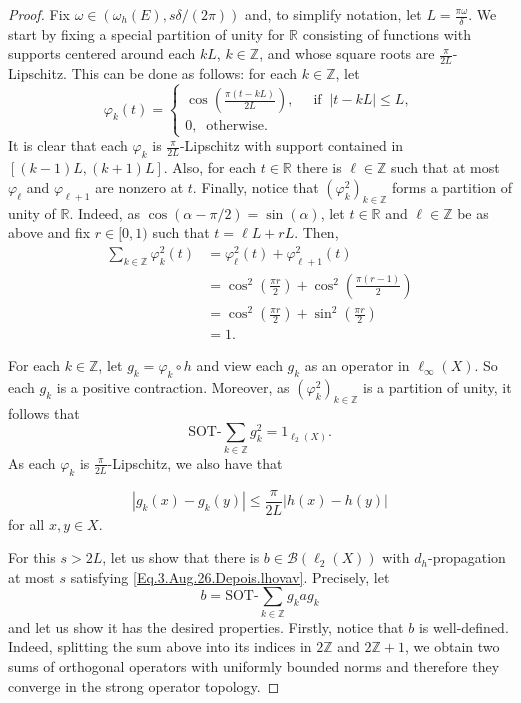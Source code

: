 \documentclass[11pt]{amsart}
\newcommand{\R}{\mathbb{R}}
\newcommand{\Z}{\mathbb{Z}}
\newcommand{\cB}{\mathcal{B}}
\numberwithin{equation}{section}
\theoremstyle{definition}
\theoremstyle{remark}
\begin{document}
\begin{proof}
Fix    $\omega\in(\omega_h(E),s\delta/(2\pi))$ and, to simplify notation, let   $L=\tfrac{\pi\omega}{\delta}$. We start by fixing   a special partition of unity for $\R$ consisting of functions with supports centered around each $kL$, $k\in\Z$, and whose square roots are $\tfrac{\pi}{2L}$-Lipschitz. This can be done as follows: for each $k\in \Z$, let
\begin{equation}\varphi_k(t)=\left\{\begin{array}{ll}
\cos\left(\frac{\pi(t-kL)}{2L}\right) ,    & \ \text{ if }\ |t-kL|\leq L,\\
    0, \ \text{ otherwise}.&
\end{array}\right.
\end{equation}
It is clear that each $\varphi_k$ is $\tfrac{\pi}{2L}$-Lipschitz with support contained in $[(k-1)L,(k+1)L]$. Also, for each   $t\in \R$ there is $\ell\in\Z$ such that at most $\varphi_\ell$ and $\varphi_{\ell+1}$ are nonzero at $t$. Finally, notice that  $(\varphi_k^2)_{k\in\Z}$ forms a partition of unity of $\R$. Indeed, as $\cos(\alpha-\pi/2)=\sin(\alpha)$, let $t\in \R$ and $\ell\in \Z$ be as above and fix $r\in [0,1)$ such that $t=\ell L+rL$. Then,
\begin{align*}
\sum_{k\in\Z}\varphi_k^2(t) &=\varphi_\ell^2(t)+   \varphi_{\ell+1}^2(t)\\
&=\cos^2\left(\frac{\pi r}{2}\right)+\cos^2\left(\frac{\pi(r-1)}{2}\right)\\
&=\cos^2\left(\frac{\pi r}{2}\right)+\sin^2\left(\frac{\pi r}{2}\right)\\
&=1.
\end{align*}


For each $k\in \Z$, let $g_k=\varphi_k\circ h$ and view each $g_k$ as an operator in $\ell_\infty(X)$. So each $g_k$ is a positive contraction. Moreover, as $(\varphi_k^2)_{k\in\Z}$ is a partition of unity, it follows that
\[\text{SOT-}\sum_{k\in \Z}g_k^2=1_{\ell_2(X)}.\]
As each $\varphi_k$ is $\tfrac{\pi}{2L}$-Lipschitz, we also have that

    \begin{equation}\label{eq:lip}
|g_k(x)-g_k(y)|\le\frac{\pi}{2L}|h(x)-h(y)|
\end{equation}
for all $x,y\in X$.



For this $s>2L$, let us show that there is $b\in\cB(\ell_2(X))$ with $d_h$-propagation at most $s$  satisfying \eqref{Eq.3.Aug.26.Depois.lhovav}. Precisely, let
\[
b=\text{SOT-}\sum_{k\in\Z}g_kag_k
\]
and let us show it  has the desired properties. Firstly, notice that $b$ is   well-defined. Indeed, splitting the sum above into its indices in   $2\Z$ and   $2\Z+1$,  we obtain two sums of orthogonal operators with uniformly bounded norms and therefore they converge in the strong operator topology.


\end{proof}
\end{document}

